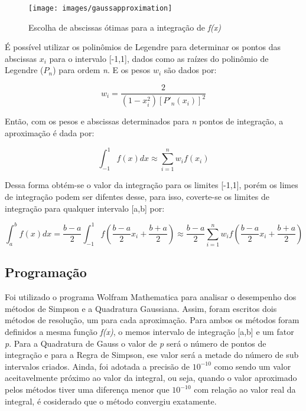\documentclass[12pt,a4paper]{article}
\begin{document}
\begin{figure}[h]
\texttt{[image: images/gaussapproximation]}
\caption{Escolha de abscissas ótimas para a integração de \textit{f(x)}}
\end{figure}

\qquad É possível utilizar os polinômios de Legendre para determinar os pontos das abscissas $x_{i}$ para o intervalo [-1,1], dados como as raízes do polinômio de Legendre (\textit{$P_{n}$}) para ordem \textit{n}. E os pesos $w_{i}$ são dados por:

\begin{equation}
w_{i}=\dfrac{2}{(1-x^2_{i})[P'_{n}(x_{i})]^2}
\end{equation}

\qquad Então, com os pesos e abscissas determinados para \textit{n} pontos de integração, a aproximação é dada por:

\begin{equation}
\int_{-1}^{1} f(x)dx \approx \sum_{i=1}^{n} w_{i}f(x_{i})
\end{equation}

\qquad Dessa forma obtém-se o valor da integração para os limites [-1,1], porém os limes de integração podem ser difentes desse, para isso, coverte-se os limites de integração para qualquer intervalo [a,b] por: 

\begin{equation}
\int_{a}^{b}f(x)dx=\dfrac{b-a}{2}\int_{-1}^{1}f(\dfrac{b-a}{2}x_{i}+\dfrac{b+a}{2})\approx\dfrac{b-a}{2}\sum_{i=1}^{n}w_{i}f(\dfrac{b-a}{2}x_{i}+\dfrac{b+a}{2})
\end{equation}


\newpage
\subsection{Programação}
\qquad Foi utilizado o programa Wolfram Mathematica para analisar o desempenho dos métodos de Simpson e a Quadratura Gaussiana. Assim, foram escritos dois métodos de resolução, um para cada aproximação. Para ambos os métodos foram definidos a mesma função \textit{f(x)}, o memos intervalo de integração [a,b] e um fator \textit{p}. Para a Quadratura de Gauss o valor de \textit{p} será o número de pontos de integração e para a Regra de Simpson, ese valor será a metade do número de sub intervalos criados. Ainda, foi adotada a precisão de $10^{-10}$ como sendo um valor aceitavelmente próximo ao valor da integral, ou seja, quando o valor aproximado pelos métodos tiver uma diferença menor que $10^{-10}$ com relação ao valor real da integral, é cosiderado que o método convergiu exatamente.\\
\end{document}
